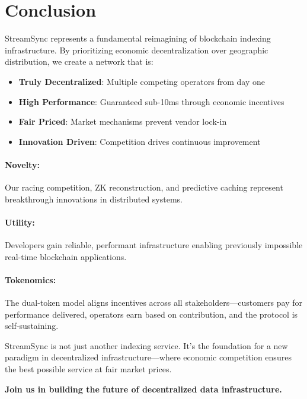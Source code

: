 \documentclass[12pt,a4paper]{article}
\begin{document}
\section{Conclusion}

StreamSync represents a fundamental reimagining of blockchain indexing infrastructure. By prioritizing economic decentralization over geographic distribution, we create a network that is:

\begin{itemize}
    \item \textbf{Truly Decentralized}: Multiple competing operators from day one
    \item \textbf{High Performance}: Guaranteed sub-10ms through economic incentives
    \item \textbf{Fair Priced}: Market mechanisms prevent vendor lock-in
    \item \textbf{Innovation Driven}: Competition drives continuous improvement
\end{itemize}

\paragraph{Novelty:} Our racing competition, ZK reconstruction, and predictive caching represent breakthrough innovations in distributed systems.

\paragraph{Utility:} Developers gain reliable, performant infrastructure enabling previously impossible real-time blockchain applications.

\paragraph{Tokenomics:} The dual-token model aligns incentives across all stakeholders—customers pay for performance delivered, operators earn based on contribution, and the protocol is self-sustaining.

StreamSync is not just another indexing service. It's the foundation for a new paradigm in decentralized infrastructure—where economic competition ensures the best possible service at fair market prices.

\vspace{1cm}
\begin{center}
\textbf{Join us in building the future of decentralized data infrastructure.}
\end{center}

\newpage


\end{document}
